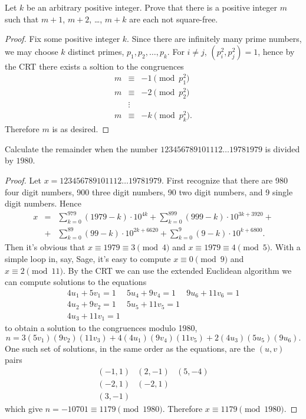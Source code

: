 \documentclass[10pt]{amsart}
\begin{document}
\begin{thm}
	Let $k$ be an arbitrary positive integer.
	Prove that there is a positive integer $m$ such that $m + 1$, $m + 2$, \ldots, $m + k$ are each not square-free.
	
	\begin{proof}
		Fix some positive integer $k$.
		Since there are infinitely many prime numbers, we may choose $k$ distinct primes, $p_1, p_2, \ldots, p_k$.
		For $i \neq j$, $(p_i^2, p_j^2) = 1$, hence by the CRT there exists a soltion to the congruences
		\begin{eqnarray*}
			m &\equiv& -1 \pmod{p_1^2}\\
			m &\equiv& -2 \pmod{p_2^2}\\
			& \vdots & \\
			m &\equiv& -k \pmod{p_k^2}.
		\end{eqnarray*}
		Therefore $m$ is as desired.
	\end{proof}
\end{thm}

\begin{thm}
	Calculate the remainder when the number $123456789101112 \ldots 19781979$ is divided by $1980$.
	
	\begin{proof}
		Let $x = 123456789101112 \ldots 19781979$.
		First recognize that there are 980 four digit numbers, 900 three digit numbers, 90 two digit numbers, and 9 single digit numbers.
		Hence
		\begin{eqnarray*}
			x &=& \sum_{k = 0}^{979} (1979 - k) \cdot 10^{4k} + \sum_{k = 0}^{899} (999 - k) \cdot 10^{3k + 3920} + \\
			&+& \sum_{k = 0}^{89} (99 - k) \cdot 10^{2k + 6620} + \sum_{k = 0}^9 (9 - k) \cdot 10^{k + 6800}.
		\end{eqnarray*}
		Then it's obvious that $x \equiv 1979 \equiv 3 \pmod{4}$ and $x \equiv 1979 \equiv 4 \pmod{5}$.
		With a simple loop in, say, Sage, it's easy to compute $ x \equiv 0 \pmod{9}$ and $x \equiv 2 \pmod{11}$.	
		By the CRT we can use the extended Euclidean algorithm we can compute solutions to the equations
		$$\begin{array}{lll}
			4u_1 + 5v_1=1 & 5u_4 + 9v_4 = 1 & 9u_6 + 11v_6 = 1\\
			4u_2 + 9v_2 = 1& 5u_5 + 11v_5 = 1\\
			4u_3 + 11v_1 = 1
		\end{array}$$
		to obtain a solution to the congruences modulo 1980,
		$$n = 3(5 v_1) (9v_2)(11v_3) + 4(4u_1)(9v_4)(11v_5) + 2(4u_3)(5u_5)(9u_6).$$
		One such set of solutions, in the same order as the equations, are the $(u,v)$ pairs
		$$\begin{array}{lll}
			\left(-1, 1\right) & \left(2, -1\right) & \left(5, -4\right)\\
			\left(-2, 1\right) & \left(-2, 1\right)\\
			\left(3, -1\right)
		\end{array}$$
		which give $n = -10701 \equiv 1179 \pmod{1980}.$
		Therefore $x \equiv 1179 \pmod{1980}$.
	\end{proof}
\end{thm}
\end{document}
